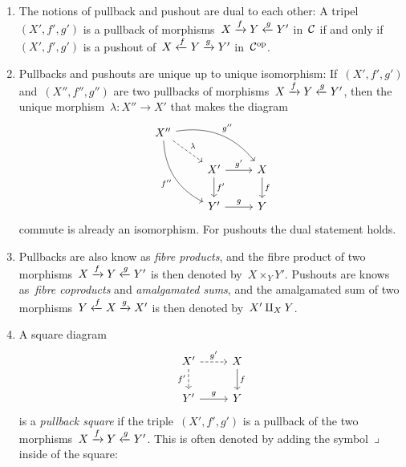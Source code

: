 \begin{remark*}
  \leavevmode
  \begin{enumerate}
    \item
      The notions of pullback and pushout are dual to each other:
      A tripel~$(X', f', g')$ is a pullback of morphisms~$X \xrightarrow{f} Y \xleftarrow{g} Y'$ in~$\mathcal{C}$ if and only if~$(X', f', g')$ is a pushout of~$X \xleftarrow{f} Y \xrightarrow{g} Y'$ in~$\mathcal{C}^{\mathrm{op}}$.
    \item
      Pullbacks and pushouts are unique up to unique isomorphism:
      If~$(X', f', g')$ and~$(X'', f'', g'')$ are two pullbacks of morphisms~$X \xrightarrow{f} Y \xleftarrow{g} Y'$, then the unique morphism~$\lambda \colon X'' \to X'$ that makes the diagram
      \[
        \begin{tikzcd}
            X''
            \arrow[bend left]{drr}[above right]{g''}
            \arrow[dashed]{dr}[above right]{\lambda}
            \arrow[bend right]{ddr}[below left]{f''}
          & {}
          & {}
          \\
            {}
          & X'
            \arrow{r}[above]{g'}
            \arrow{d}[right]{f'}
          & X
            \arrow{d}[right]{f}
          \\
            {}
          & Y'
            \arrow{r}[above]{g}
          & Y
        \end{tikzcd}
      \]
      commute is already an isomorphism.
      For pushouts the dual statement holds.
    \item
      Pullbacks are also know as \emph{fibre products}, and the fibre product of two morphisms~$X \xrightarrow{f} Y \xleftarrow{g} Y'$ is then denoted by~$X \times_Y Y'$.
      Pushouts are knows as~\emph{fibre coproducts} and \emph{amalgamated sums}, and the amalgamated sum of two morphisms~$Y \xleftarrow{f} X \xrightarrow{g} X'$ is then denoted by~$X' \amalg_X Y$.
    \item
      A square diagram
      \[
        \begin{tikzcd}
            X'
            \arrow[dashed]{r}[above]{g'}
            \arrow[dashed]{d}[left]{f'}
          & X
            \arrow{d}[right]{f}
          \\
            Y'
            \arrow{r}[above]{g}
          & Y
        \end{tikzcd}
      \]
      is a \emph{pullback square} if the triple~$(X',f',g')$ is a pullback of the two morphisms~$X \xrightarrow{f} Y \xleftarrow{g} Y'$.
      This is often denoted by adding the symbol~$\lrcorner$ inside of the square: 

\end{enumerate}
\end{remark*}
